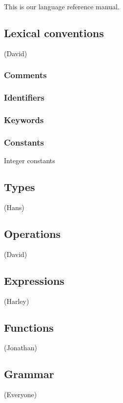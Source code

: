 This is our language reference manual. 

\subsection{Lexical conventions}

(David)

\subsubsection{Comments}

\subsubsection{Identifiers}

\subsubsection{Keywords}

\subsubsection{Constants}
Integer constants

\subsection{Types}

(Hans)

\subsection{Operations}

(David)

\subsection{Expressions}

(Harley)

\subsection{Functions}

(Jonathan)

\subsection{Grammar}

(Everyone)

